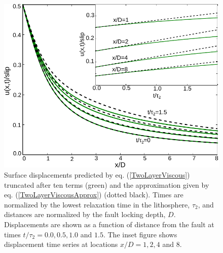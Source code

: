 \documentclass[extra,mreferee]{gji}
\begin{document}
\begin{figure}\label{figure1}
  \centering 
  \includegraphics{figures/Fig1.pdf}
  \caption{Surface displacements predicted by
    eq. (\ref{TwoLayerViscous}) truncated after ten terms (green) and
    the approximation given by eq. (\ref{TwoLayerViscousApprox})
    (dotted black).  Times are normalized by the lowest relaxation
    time in the lithosphere, $\tau_2$, and distances are normalized by
    the fault locking depth, $D$.  Displacements are shown as a
    function of distance from the fault at times $t/\tau_2 =
    0.0,0.5,1.0$ and $1.5$. The inset figure shows displacement time
    series at locations $x/D = 1, 2, 4$ and $8$.}
  \label{Figure 1}
\end{figure} 
\end{document}
